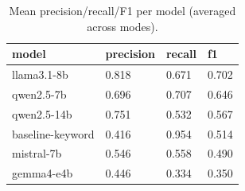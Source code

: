 \begin{table}[ht]
\centering
\caption{Mean precision/recall/F1 per model (averaged across modes).}
\label{tab:per_model}
\begin{tabular}{llll}
\toprule
model & precision & recall & f1 \\
\midrule
llama3.1-8b & 0.818 & 0.671 & 0.702 \\
qwen2.5-7b & 0.696 & 0.707 & 0.646 \\
qwen2.5-14b & 0.751 & 0.532 & 0.567 \\
baseline-keyword & 0.416 & 0.954 & 0.514 \\
mistral-7b & 0.546 & 0.558 & 0.490 \\
gemma4-e4b & 0.446 & 0.334 & 0.350 \\
\bottomrule
\end{tabular}
\end{table}
